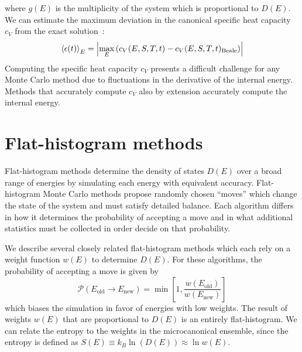 \documentclass[letterpaper,twocolumn,amsmath,amssymb,pre,aps,10pt]{revtex4-1}
\begin{document}
where $g(E)$ is the multiplicity of the system which is proportional to
$D(E)$. We can estimate the maximum deviation in the canonical specific heat capacity $c_V$ from the exact solution~\cite{schneider2017convergence, shakirov2018convergence,
barash2017control,barash2017gpu}:
\begin{align}
\braket{\epsilon(t)}_E = \left|\max_E \left(c_V(E,S,T,t) - c_V(E,S,T,t)_{\text{Beale}}\right)\right|
\end{align}
Computing the specific heat capacity $c_V$ presents a difficult challenge for
any Monte Carlo method due to fluctuations in the derivative of the internal energy.  Methods that accurately compute $c_V$ also by extension accurately compute the internal energy.

\section{Flat-histogram methods}\label{sec:histogram}
Flat-histogram methods determine the density of states $D(E)$ over a broad range
of energies by simulating each energy with equivalent accuracy. Flat-histogram
Monte Carlo methods propose randomly chosen ``moves'' which change the state of
the system and must satisfy detailed balance.  Each algorithm differs in how it
determines the probability of accepting a move and in what additional statistics
must be collected in order decide on that probability.

We describe several closely related flat-histogram methods which each rely on a
weight function $w(E)$ to determine $D(E)$.  For these algorithms, the
probability of accepting a move is given by
\begin{equation}
	\mathcal{P}(E_\text{old} \rightarrow E_\text{new})
	= \min\left[1,\frac{w(E_\text{old})}{w(E_\text{new})}\right]
\end{equation}
which biases the simulation in favor of energies with low weights. The result of
weights $w(E)$ that are proportional to $D(E)$ is an entirely flat-histogram. We
can relate the entropy to the weights in the microcanonical ensemble, since the
entropy is defined as $S(E) \equiv k_B\ln(D(E)) \approx \ln w(E)$.
\end{document}
